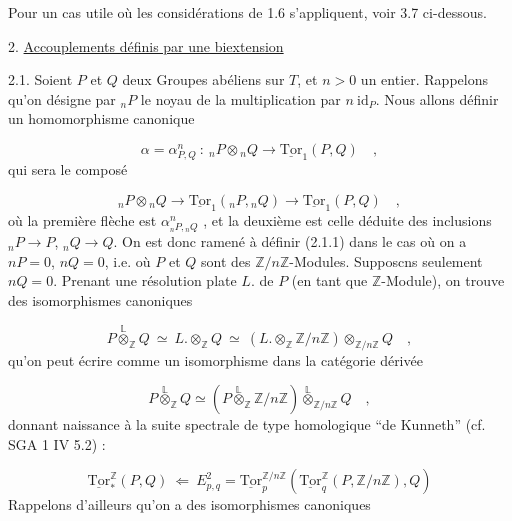 Pour un cas utile où les considérations de 1.6 s'appliquent, voir 3.7 ci-dessous.


2. \underline{Accouplements définis par une biextension}

2.1.  Soient $P$ et $Q$ deux Groupes abéliens sur $T$, et $n > 0$ un entier. Rappelons qu'on désigne par ${}_nP$ le noyau de la multiplication par $n \ \mathrm{id}_P$. Nous allons définir un homomorphisme canonique 



\begin{equation}\tag{2.1.1}
 \alpha = \alpha^n_{P,Q} \ : \ {}_nP \otimes {}_nQ \longrightarrow \underline{\mathrm{Tor}}_1(P,Q) \quad ,
\end{equation}
qui sera le composé

\begin{equation}\tag{2.1.2}
{}_nP \otimes {}_nQ \longrightarrow \underline{\mathrm{Tor}}_1({}_nP,{}_nQ) \longrightarrow \underline{\mathrm{Tor}}_1(P,Q) \quad ,
\end{equation}
où la première flèche est $\alpha^n_{{}_nP,{}_nQ}$ , et la deuxième est celle déduite des inclusions ${}_nP \longrightarrow P$, ${}_nQ \longrightarrow Q$. On est donc ramené à définir (2.1.1) dans le cas où on a $nP = 0$, $nQ = 0$, i.e. où $P$ et $Q$ sont des $\mathbb{Z}/n\mathbb{Z}$-Modules. Supposcns seulement $nQ = 0$. Prenant une résolution plate $L.$ de $P$ (en tant que $\mathbb{Z}$-Module), on trouve des isomorphismes canoniques

\begin{equation*}
P \overset{\mathbb{L}}{\otimes}_{\mathbb{Z}} Q \ \simeq \ L. \otimes_{\mathbb{Z}} Q \ \simeq \ (L. \otimes_{\mathbb{Z}} \mathbb{Z}/n\mathbb{Z}) \otimes_{\mathbb{Z}/n\mathbb{Z}} Q \quad ,
\end{equation*}
qu'on peut écrire comme un isomorphisme dans la catégorie dérivée

\begin{equation}\tag{2.1.3}
P \overset{\mathbb{L}}{\otimes}_{\mathbb{Z}} Q \simeq (P \overset{\mathbb{L}}{\otimes}_{\mathbb{Z}} \mathbb{Z}/n\mathbb{Z}) \overset{\mathbb{L}}{\otimes}_{\mathbb{Z}/n\mathbb{Z}} Q \quad ,
\end{equation}
donnant naissance à la suite spectrale de type homologique ``de Kunneth'' (cf. SGA 1 IV 5.2) :

\begin{equation}\tag{2.1.4}
\underline{\mathrm{Tor}}^{\mathbb{Z}}_*(P,Q) \ \Longleftarrow \ E^2_{p,q} = \underline{\mathrm{Tor}}^{\mathbb{Z}/n\mathbb{Z}}_p(\underline{\mathrm{Tor}}^{\mathbb{Z}}_q(P,\mathbb{Z}/n\mathbb{Z}),Q)
\end{equation}
Rappelons d'ailleurs qu'on a des isomorphismes canoniques

